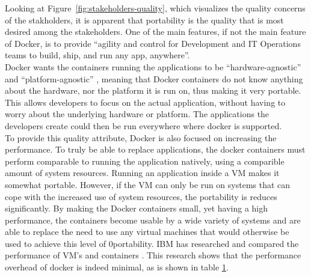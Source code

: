Looking at Figure~\ref{fig:stakeholders-quality}, which visualizes the quality concerns of the stakholders, it is apparent that portability is the quality that is most desired among the stakeholders. One of the main features, if not the main feature of Docker, is to provide ``agility and control for Development and IT Operations teams to build, ship, and run any app, anywhere''\cite{dockermain}.\\
Docker wants the containers running the applications to be ``hardware-agnostic'' and ``platform-agnostic'' \cite{dockerrepo}, meaning that Docker containers do not know anything about the hardware, nor the platform it is run on, thus making it very portable. This allows developers to focus on the actual application, without having to worry about the underlying hardware or platform. The applications the developers create could then be run everywhere where docker is supported.\\
To provide this quality attribute, Docker is also focused on increasing the performance. To truly be able to replace applications, the docker containers must perform comparable to running the application natively, using a comparible amount of system resources. Running an application inside a VM makes it somewhat portable. However, if the VM can only be run on systems that can cope with the increased use of system resources, the portability is reduces significantly. By making the Docker containers small, yet having a high performance, the containers become usable by a wide variety of systems and are able to replace the need to use any virtual machines that would otherwise be used to achieve this level of 0portability\cite{dockerrepo}. IBM has researched and compared the performance of VM's and containers \cite{IBM-performance}. This research shows that the performance overhead of docker is indeed minimal, as is shown in table \ref{fig:ibm-dockerperforrmance}.

\begin{figure}[H]
\centering
\begin{center}
\end{center}
\label{fig:ibm-dockerperforrmance}
\end{figure}

